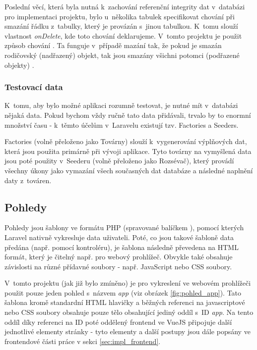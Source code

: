 	Poslední věcí, která byla nutná k~zachování referenční integrity dat v~databázi pro implementaci projektu, bylo u~několika tabulek specifikovat chování při smazání řádku z~tabulky, který je provázán s~jinou tabulkou. K~tomu slouží vlastnost \textit{onDelete}, kde toto chování deklarujeme. V~tomto projektu je použit způsob chování . Ta funguje v~případě mazání tak, že pokud je smazán rodičovský (nadřazený) objekt, tak jsou smazány všichni potomci (podřazené objekty) \cite{CascadeDel}.
		
		\subsubsection{Testovací data}
		K~tomu, aby bylo možné aplikaci rozumně testovat, je nutné mít v~databázi nějaká data. Pokud bychom vždy ručně tato data přidávali, trvalo by to enormní množství času - k~těmto účelům v~Laravelu existují tzv. Factories a Seeders.
		
		Factories (volně přeloženo jako Továrny) slouží k~vygenerování výplňových dat, která jsou použita primárně při vývoji aplikace. Tyto továrny na vymyšlená data jsou poté použity v~Seederu (volně přeloženo jako Rozsévač), který provádí všechny úkony jako vymazání všech současných dat databáze a následné naplnění daty z~továren.
	
	\subsection{Pohledy}\label{sec:be_pohledy}
	Pohledy jsou šablony ve formátu PHP (spravované balíčkem ), pomocí kterých Laravel nativně vykresluje data uživateli. Poté, co jsou takové šabloně data předána (např. pomocí kontroléru), je šablona následně převedena na HTML formát, který je čitelný např. pro webový prohlížeč. Obvykle také obsahuje závislosti na různé přídavné soubory - např. JavaScript nebo CSS soubory. 
	
	V~tomto projektu (jak již bylo zmíněno) je pro vykreslení ve webovém prohlížeči použit pouze jeden pohled s~názvem \textit{app} (viz obrázek \ref{fig:pohled_app}). Tato šablona kromě standardní HTML hlavičky a běžných referenci na javascriptové nebo CSS soubory obsahuje pouze tělo obsahující jediný oddíl s~ID \textit{app}. Na tento oddíl díky referenci na ID poté oddělený frontend ve VueJS připojuje další jednotlivé elementy stránky - tyto elementy a další postupy jsou dále popsány ve frontendové části práce v sekci \ref{sec:impl_frontend}.
	
